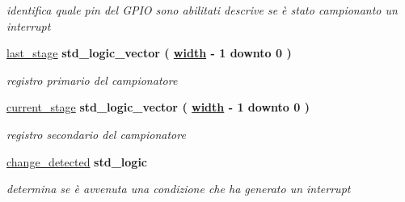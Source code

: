 \begin{DoxyCompactItemize}
\begin{DoxyCompactList}\small\item\em identifica quale pin del G\+P\+IO sono abilitati descrive se è stato campionanto un interrupt \end{DoxyCompactList}\item 
\mbox{\label{classGPIO__v1__0__S00__AXI_1_1arch__imp_abbf01ed939d4259b9f5cd1da3bf8c81d}} 
\hyperlink{classGPIO__v1__0__S00__AXI_1_1arch__imp_abbf01ed939d4259b9f5cd1da3bf8c81d}{last\+\_\+stage} {\bfseries \textcolor{vhdlchar}{std\+\_\+logic\+\_\+vector}\textcolor{vhdlchar}{ }\textcolor{vhdlchar}{(}\textcolor{vhdlchar}{ }\textcolor{vhdlchar}{ }\textcolor{vhdlchar}{ }\textcolor{vhdlchar}{ }{\bfseries \hyperlink{classGPIO__v1__0__S00__AXI_a16bbf9205afa677edb8a74dcd39ebb9f}{width}} \textcolor{vhdlchar}{-\/}\textcolor{vhdlchar}{ } \textcolor{vhdldigit}{1} \textcolor{vhdlchar}{ }\textcolor{vhdlchar}{downto}\textcolor{vhdlchar}{ }\textcolor{vhdlchar}{ } \textcolor{vhdldigit}{0} \textcolor{vhdlchar}{ }\textcolor{vhdlchar}{)}\textcolor{vhdlchar}{ }} 
\begin{DoxyCompactList}\small\item\em registro primario del campionatore \end{DoxyCompactList}\item 
\mbox{\label{classGPIO__v1__0__S00__AXI_1_1arch__imp_a0d3a1f6396a5b16ea1ae6e06e9af061e}} 
\hyperlink{classGPIO__v1__0__S00__AXI_1_1arch__imp_a0d3a1f6396a5b16ea1ae6e06e9af061e}{current\+\_\+stage} {\bfseries \textcolor{vhdlchar}{std\+\_\+logic\+\_\+vector}\textcolor{vhdlchar}{ }\textcolor{vhdlchar}{(}\textcolor{vhdlchar}{ }\textcolor{vhdlchar}{ }\textcolor{vhdlchar}{ }\textcolor{vhdlchar}{ }{\bfseries \hyperlink{classGPIO__v1__0__S00__AXI_a16bbf9205afa677edb8a74dcd39ebb9f}{width}} \textcolor{vhdlchar}{-\/}\textcolor{vhdlchar}{ } \textcolor{vhdldigit}{1} \textcolor{vhdlchar}{ }\textcolor{vhdlchar}{downto}\textcolor{vhdlchar}{ }\textcolor{vhdlchar}{ } \textcolor{vhdldigit}{0} \textcolor{vhdlchar}{ }\textcolor{vhdlchar}{)}\textcolor{vhdlchar}{ }} 
\begin{DoxyCompactList}\small\item\em registro secondario del campionatore \end{DoxyCompactList}\item 
\mbox{\label{classGPIO__v1__0__S00__AXI_1_1arch__imp_aab51abc2eb680c6f972e0d63ab4fc591}} 
\hyperlink{classGPIO__v1__0__S00__AXI_1_1arch__imp_aab51abc2eb680c6f972e0d63ab4fc591}{change\+\_\+detected} {\bfseries \textcolor{vhdlchar}{std\+\_\+logic}\textcolor{vhdlchar}{ }} 
\begin{DoxyCompactList}\small\item\em determina se è avvenuta una condizione che ha generato un interrupt \end{DoxyCompactList}\end{DoxyCompactItemize}
